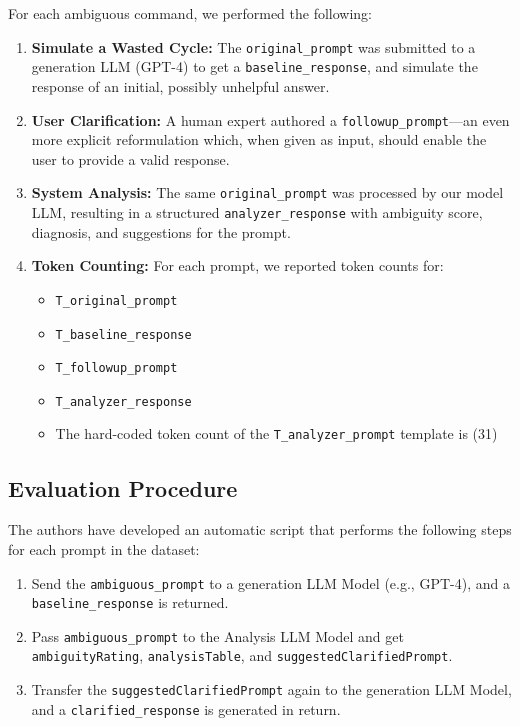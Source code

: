 \documentclass[conference]{IEEEtran}
\begin{document}
For each ambiguous command, we performed the following:
\begin{enumerate}
    \item \textbf{Simulate a Wasted Cycle:}
    The \texttt{original\_prompt} was submitted to a generation LLM (GPT-4) to get a \texttt{baseline\_response}, and simulate the response of an initial, possibly unhelpful answer.
    \item \textbf{User Clarification:}
    A human expert authored a \texttt{followup\_prompt}—an even more explicit reformulation which, when given as input, should enable the user to provide a valid response.
    \item \textbf{System Analysis:}
    The same \texttt{original\_prompt} was processed by our model LLM, resulting in a structured \texttt{analyzer\_response} with ambiguity score, diagnosis, and suggestions for the prompt.
    \item \textbf{Token Counting:}
    For each prompt, we reported token counts for:
    \begin{itemize}
        \item \texttt{T\_original\_prompt}
        \item \texttt{T\_baseline\_response}
        \item \texttt{T\_followup\_prompt}
        \item \texttt{T\_analyzer\_response}
        \item The hard-coded token count of the \texttt{T\_analyzer\_prompt} template is (31)
    \end{itemize}
\end{enumerate}

\subsection{Evaluation Procedure}
The authors have developed an automatic script that performs the following steps for each prompt in the dataset:
\begin{enumerate}
   \item Send the \texttt{ambiguous\_prompt} to a generation LLM Model (e.g., GPT-4), and a  \texttt{baseline\_response} is returned.
    \item Pass \texttt{ambiguous\_prompt} to the Analysis LLM Model and get \texttt{ambiguityRating}, \texttt{analysisTable}, and \texttt{suggestedClarifiedPrompt}.
    \item Transfer the \texttt{suggestedClarifiedPrompt} again to the generation LLM Model, and a \texttt{clarified\_response} is generated in return.
\end{enumerate}
\end{document}
